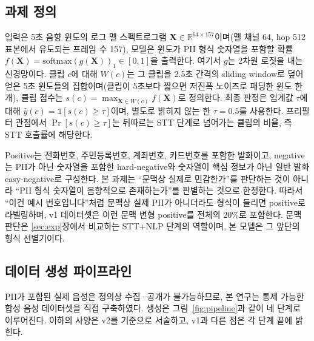 \documentclass[11pt]{article}
\begin{document}
\subsection{과제 정의}
입력은 5초 음향 윈도의 로그 멜 스펙트로그램 $\mathbf{X}\in\mathbb{R}^{64\times157}$이며(멜
채널 64, hop 512 표본에서 유도되는 프레임 수 157), 모델은 윈도가 PII 형식 숫자열을 포함할
확률 $f(\mathbf{X})=\mathrm{softmax}(g(\mathbf{X}))_1\in[0,1]$을 출력한다. 여기서 $g$는
2차원 로짓을 내는 신경망이다. 클립 $c$에 대해 $W(c)$는 그 클립을 2.5초 간격의 sliding
window로 덮어 얻은 5초 윈도들의 집합이며(클립이 5초보다 짧으면 저진폭 노이즈로 패딩한 윈도
한 개), 클립 점수는 $s(c)=\max_{\mathbf{X}\in W(c)} f(\mathbf{X})$로 정의한다. 최종 판정은
임계값 $\tau$에 대해 $\hat{y}(c)=\mathbb{1}[s(c)\ge\tau]$이며, 별도로 밝히지 않는 한
$\tau=0.5$를 사용한다. 프리필터 관점에서 $\Pr[s(c)\ge\tau]$는 뒤따르는 STT 단계로 넘어가는
클립의 비율, 즉 STT 호출률에 해당한다.

Positive는 전화번호, 주민등록번호, 계좌번호, 카드번호를 포함한 발화이고, negative는 PII가
아닌 숫자열을 포함한 hard-negative와 숫자열이 핵심 정보가 아닌 일반 발화 easy-negative로
구성한다. 본 과제는 ``문맥상 실제로 민감한가''를 판단하는 것이 아니라 ``PII 형식 숫자열이
음향적으로 존재하는가''를 판별하는 것으로 한정한다. 따라서 ``이건 예시 번호입니다''처럼
문맥상 실제 PII가 아니더라도 형식이 들리면 positive로 라벨링하며, v1 데이터셋은 이런 문맥
변형 positive를 전체의 20\%로 포함한다. 문맥 판단은 \ref{sec:exp}장에서 비교하는 STT+NLP
단계의 역할이며, 본 모델은 그 앞단의 형식 선별기이다.

\subsection{데이터 생성 파이프라인}\label{sec:data:pipeline}
PII가 포함된 실제 음성은 정의상 수집·공개가 불가능하므로, 본 연구는 통제 가능한 합성
음성 데이터셋을 직접 구축하였다. 생성은 그림~\ref{fig:pipeline}과 같이 네 단계로
이루어진다. 이하의 사양은 v2를 기준으로 서술하고, v1과 다른 점은 각 단계 끝에 밝힌다.
\end{document}

